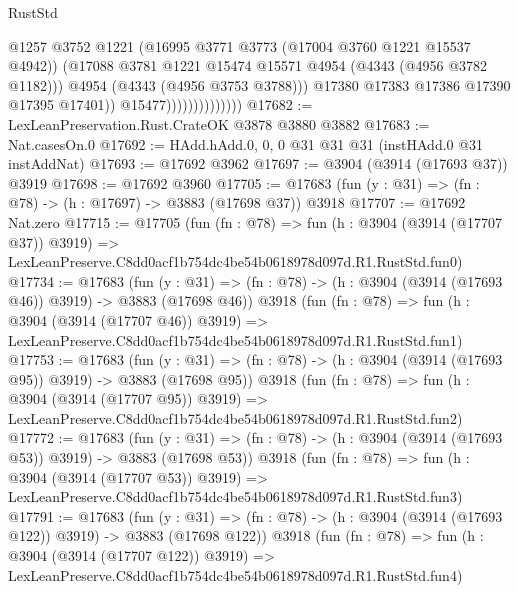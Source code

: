 \begin{lexlean}{RustStd}
\begin{coremodule}
                                      @1257
                                      @3752
                                      @1221
                                      (@16995 @3771 @3773 (@17004 @3760 @1221 @15537 @4942))
                                      (@17088
                                        @3781
                                        @1221
                                        @15474
                                        @15571
                                        @4954
                                        (@4343 (@4956 @3782 @1182)))
                                      @4954
                                      (@4343 (@4956 @3753 @3788)))
                                    @17380
                                    @17383
                                    @17386
                                    @17390
                                    @17395
                                    @17401))
                                @15477))))))))))))))
@17682 := LexLeanPreservation.Rust.CrateOK @3878 @3880 @3882
@17683 := Nat.casesOn.{0}
@17692 := HAdd.hAdd.{0, 0, 0} @31 @31 @31 (instHAdd.{0} @31 instAddNat)
@17693 := @17692 @3962
@17697 := @3904 (@3914 (@17693 @37)) @3919
@17698 := @17692 @3960
@17705 := @17683 (fun (y : @31) => (fn : @78) -> (h : @17697) -> @3883 (@17698 @37)) @3918
@17707 := @17692 Nat.zero
@17715 := @17705
    (fun (fn : @78) =>
    fun (h : @3904 (@3914 (@17707 @37)) @3919) =>
    LexLeanPreserve.C8dd0acf1b754dc4be54b0618978d097d.R1.RustStd.fun0)
@17734 := @17683
    (fun (y : @31) => (fn : @78) -> (h : @3904 (@3914 (@17693 @46)) @3919) -> @3883 (@17698 @46))
    @3918
    (fun (fn : @78) =>
    fun (h : @3904 (@3914 (@17707 @46)) @3919) =>
    LexLeanPreserve.C8dd0acf1b754dc4be54b0618978d097d.R1.RustStd.fun1)
@17753 := @17683
    (fun (y : @31) => (fn : @78) -> (h : @3904 (@3914 (@17693 @95)) @3919) -> @3883 (@17698 @95))
    @3918
    (fun (fn : @78) =>
    fun (h : @3904 (@3914 (@17707 @95)) @3919) =>
    LexLeanPreserve.C8dd0acf1b754dc4be54b0618978d097d.R1.RustStd.fun2)
@17772 := @17683
    (fun (y : @31) => (fn : @78) -> (h : @3904 (@3914 (@17693 @53)) @3919) -> @3883 (@17698 @53))
    @3918
    (fun (fn : @78) =>
    fun (h : @3904 (@3914 (@17707 @53)) @3919) =>
    LexLeanPreserve.C8dd0acf1b754dc4be54b0618978d097d.R1.RustStd.fun3)
@17791 := @17683
    (fun (y : @31) => (fn : @78) -> (h : @3904 (@3914 (@17693 @122)) @3919) -> @3883 (@17698 @122))
    @3918
    (fun (fn : @78) =>
    fun (h : @3904 (@3914 (@17707 @122)) @3919) =>
    LexLeanPreserve.C8dd0acf1b754dc4be54b0618978d097d.R1.RustStd.fun4)

\end{coremodule}
\end{lexlean}
